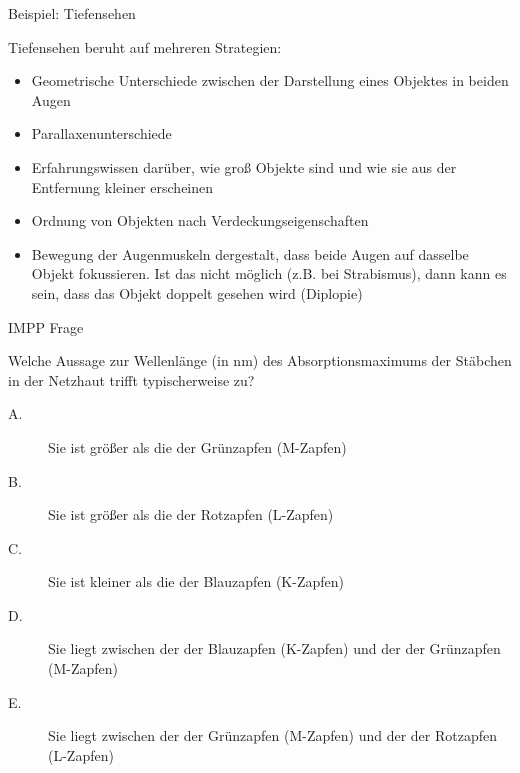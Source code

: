 \documentclass{beamer}
\begin{document}
\begin{frame}{Beispiel: Tiefensehen}

Tiefensehen beruht auf mehreren Strategien:

\begin{itemize}
    \item 
    Geometrische Unterschiede zwischen der Darstellung eines Objektes in beiden Augen
    \item
    Parallaxenunterschiede
    \item
    Erfahrungswissen darüber, wie groß Objekte sind und wie sie aus der Entfernung kleiner erscheinen
    \item
    Ordnung von Objekten nach Verdeckungseigenschaften
    \item
    Bewegung der Augenmuskeln dergestalt, dass beide Augen auf dasselbe Objekt fokussieren. Ist das nicht möglich (z.B. bei Strabismus), dann kann es sein, dass das Objekt doppelt gesehen wird (Diplopie)
\end{itemize}



\end{frame}




\begin{frame}{IMPP Frage}

Welche Aussage zur Wellenlänge (in nm) des Absorptionsmaximums der Stäbchen in der Netzhaut trifft typischerweise zu?

\begin{description}
\item[A.] Sie ist größer als die der Grünzapfen (M-Zapfen)
\item[B.] Sie ist größer als die der Rotzapfen (L-Zapfen) 
\item[C.] Sie ist kleiner als die der Blauzapfen (K-Zapfen) 
\item[D.] Sie liegt zwischen der der Blauzapfen (K-Zapfen) und der der Grünzapfen (M-Zapfen) %
\item[E.] Sie liegt zwischen der der Grünzapfen (M-Zapfen) und der der Rotzapfen (L-Zapfen) 
\end{description}

    
\end{frame}
\end{document}
